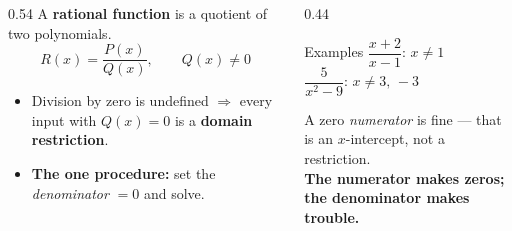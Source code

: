 \documentclass[aspectratio=169, 11pt]{beamer}
\begin{document}
\begin{frame}[t, plain]
  \begin{columns}[T]
    \begin{column}{0.54\textwidth}
      A \textbf{rational function} is a quotient of two polynomials.
      \[ R(x)=\frac{P(x)}{Q(x)}, \qquad Q(x)\neq 0 \]
      \begin{itemize}\setlength{\itemsep}{4pt}
        \item Division by zero is undefined $\Rightarrow$ every input with $Q(x)=0$ is a
              \textbf{domain restriction}.
        \item \textbf{The one procedure:} set the \emph{denominator} $=0$ and solve.
      \end{itemize}
    \end{column}
    \begin{column}{0.44\textwidth}
      \begin{block}{Examples}
        $\dfrac{x+2}{x-1}$: \; $x\neq 1$ \\[4pt]
        $\dfrac{5}{x^2-9}$: \; $x\neq 3,\,-3$
      \end{block}
      \vspace{2pt}
      {\footnotesize A zero \emph{numerator} is fine --- that is an $x$-intercept, not a restriction.
      \\[3pt] \textbf{The numerator makes zeros; the denominator makes trouble.}}
    \end{column}
  \end{columns}
\end{frame}
\end{document}
